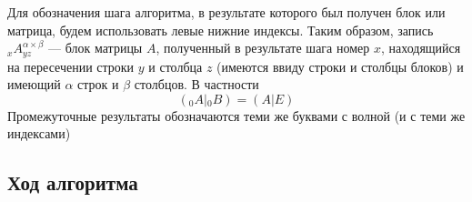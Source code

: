 \documentclass[12pt, russian]{article}
\begin{document}
Для обозначения шага алгоритма, в результате которого был получен блок или матрица, будем использовать левые нижние индексы. Таким образом, запись ${}_x A_{yz}^{\alpha\times\beta}$ --- блок матрицы $A$, полученный в результате шага номер $x$, находящийся на пересечении строки $y$ и столбца $z$ (имеются ввиду строки и столбцы блоков) и имеющий $\alpha$ строк и $\beta$ столбцов. В частности
$$ ({}_0 A|{}_0 B) = (A|E) $$
Промежуточные результаты обозначаются теми же буквами с волной (и с теми же индексами)

\subsection{Ход алгоритма}
\end{document}
